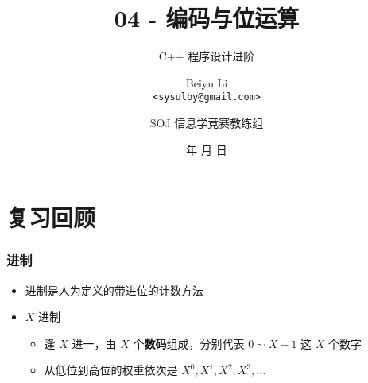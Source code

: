 \title[04 - 编码与位运算]
{04 - 编码与位运算}

\subtitle{C++ 程序设计进阶}

\author[Beiyu Li]
{Beiyu Li\\
\texttt{<sysulby@gmail.com>}}


\date[\today]
{\number\year 年 \number\month 月 \number\day 日}




\author[sysulby]
{SOJ 信息学竞赛教练组}

\begin{frame}
    \titlepage
\end{frame}
\setcounter{framenumber}{0} %


\section{复习回顾}

\begin{frame}[fragile]
    \frametitle{进制}

    \begin{itemize}[<+->]
        \item 进制是人为定义的带进位的计数方法
        \item $X$ 进制
        \begin{itemize}
           \item 逢 $X$ 进一，由 $X$ 个\textbf{数码}组成，分别代表 $0 \sim X-1$ 这 $X$ 个数字
           \item 从低位到高位的权重依次是 $X^0, X^1, X^2, X^3, ...$
        \end{itemize}
    \end{itemize}

\end{frame}

